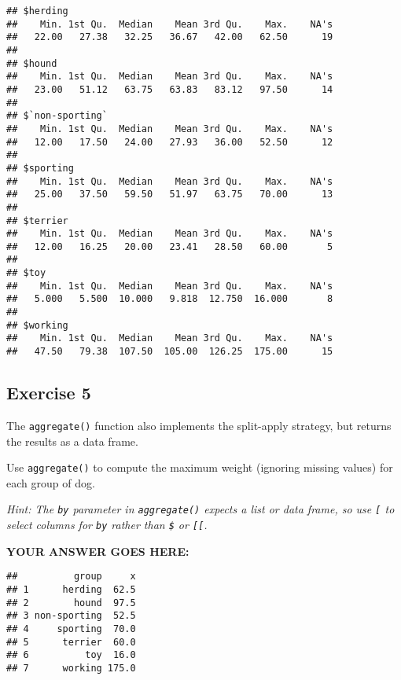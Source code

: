 \documentclass[
]{article}
\newenvironment{Shaded}{\begin{snugshade}}{\end{snugshade}}
\newcommand{\DataTypeTok}[1]{\textcolor[rgb]{0.13,0.29,0.53}{#1}}
\newcommand{\KeywordTok}[1]{\textcolor[rgb]{0.13,0.29,0.53}{\textbf{#1}}}
\newcommand{\NormalTok}[1]{#1}
\newcommand{\OperatorTok}[1]{\textcolor[rgb]{0.81,0.36,0.00}{\textbf{#1}}}
\newcommand{\OtherTok}[1]{\textcolor[rgb]{0.56,0.35,0.01}{#1}}
\newcommand{\StringTok}[1]{\textcolor[rgb]{0.31,0.60,0.02}{#1}}
\begin{document}
\begin{verbatim}
## $herding
##    Min. 1st Qu.  Median    Mean 3rd Qu.    Max.    NA's 
##   22.00   27.38   32.25   36.67   42.00   62.50      19 
## 
## $hound
##    Min. 1st Qu.  Median    Mean 3rd Qu.    Max.    NA's 
##   23.00   51.12   63.75   63.83   83.12   97.50      14 
## 
## $`non-sporting`
##    Min. 1st Qu.  Median    Mean 3rd Qu.    Max.    NA's 
##   12.00   17.50   24.00   27.93   36.00   52.50      12 
## 
## $sporting
##    Min. 1st Qu.  Median    Mean 3rd Qu.    Max.    NA's 
##   25.00   37.50   59.50   51.97   63.75   70.00      13 
## 
## $terrier
##    Min. 1st Qu.  Median    Mean 3rd Qu.    Max.    NA's 
##   12.00   16.25   20.00   23.41   28.50   60.00       5 
## 
## $toy
##    Min. 1st Qu.  Median    Mean 3rd Qu.    Max.    NA's 
##   5.000   5.500  10.000   9.818  12.750  16.000       8 
## 
## $working
##    Min. 1st Qu.  Median    Mean 3rd Qu.    Max.    NA's 
##   47.50   79.38  107.50  105.00  126.25  175.00      15
\end{verbatim}

\hypertarget{exercise-5}{%
\subsection{Exercise 5}\label{exercise-5}}

The \texttt{aggregate()} function also implements the split-apply
strategy, but returns the results as a data frame.

Use \texttt{aggregate()} to compute the maximum weight (ignoring missing
values) for each group of dog.

\emph{Hint: The \texttt{by} parameter in \texttt{aggregate()} expects a
list or data frame, so use \texttt{{[}} to select columns for
\texttt{by} rather than \texttt{\$} or \texttt{{[}{[}}.}

\textbf{YOUR ANSWER GOES HERE:}

\begin{Shaded}
\end{Shaded}

\begin{verbatim}
##          group     x
## 1      herding  62.5
## 2        hound  97.5
## 3 non-sporting  52.5
## 4     sporting  70.0
## 5      terrier  60.0
## 6          toy  16.0
## 7      working 175.0
\end{verbatim}
\end{document}
